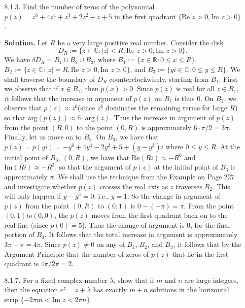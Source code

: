 \documentclass[9pt]{article}
\newcommand{\R}{\mathbb{R}}
\newcommand{\C}{\mathbb{C}}
\begin{document}
\begin{enumerate}
   \item[8.1.3.]  Find the number of zeros of the polynomial
                  $p(z) = z^6 + 4z^4 + z^3 + 2z^2 + z + 5$ in the first quadrant
                  $\{\text{Re }z > 0, \text{Im }z > 0\}$.
                  
      \textbf{Solution.} Let $R$ be a very large positive real number. Consider
      the disk
      $$D_R := \{z \in \C : |z| < R, \text{Re }z > 0, \text{Im }z > 0\}.$$
      We have $\delta D_R = B_1 \cup B_2 \cup B_3$, where
      $B_1 := \{x \in \R : 0 \le x \le R\}$, $B_2 := \{z \in \C : |z| = R, 
       \text{Re }z > 0, \text{Im }z > 0\}$, and
      $B_3 := \{yi \in \C : 0 \le y \le R\}$. We shall traverse the boundary
      of $D_R$ counterclockwisely, starting from $B_1$. First we observe that
      if $x \in B_1$, then $p(x) > 0$. Since $p(z)$ is real for all $z \in B_1$,
      it follows that the increase in argument of $p(z)$ on $B_1$ is thus 0.
      On $B_2$, we observe that $p(z) \approx z^6$(since $z^6$ dominates the
      remaining terms for large $R$) so that
      $\text{arg}(p(z)) \approx 6 \cdot \text{arg}(z)$. Thus the increase in
      argument of $p(z)$ from the point $(R, 0)$ to the point $(0, R)$ is
      approximately $6 \cdot \pi/ 2 = 3\pi$. Finally, let us move on to $B_3$.
      On $B_3$, we have that $p(z) = p(yi) = -y^6 + 4y^4 - 2y^2 + 5 + (y- y^3)i$
      where $0 \le y \le R$. At the initial point of $B_3$, $(0, R)$, we have
      that $\text{Re}(Ri) \approx -R^6$ and $\text{Im}(Ri) \approx -R^3$, so
      that the argument of $p(z)$ at the initial point of $B_3$ is approximately
      $\pi$. We shall use the technique from the Example on Page 227 and
      investigate whether $p(z)$  crosses the real axis as $z$ traverses $B_2$.
      This will only happen if $y - y^3 = 0$; i.e., $y = 1$. So the change in
      argument of $p(z)$ from the point $(0, R)$ to $(0, 1)$ is
      $0 - (-\pi) = \pi$. From the point $(0, 1) to (0, 0)$, the $p(z)$ moves
      from the first quadrant back on to the real line (since $p(0) = 5$). Thus
      the change of argument is 0, for the final portion of $B_3$. It follows
      that the total increase in argument is approximately $3\pi + \pi = 4\pi$.
      Since $p(z) \neq 0$ on any of $B_1$, $B_2$, and $B_3$, it follows that
      by the Argument Principle that the number of zeros of $p(z)$ that lie in
      the first quadrant is $4\pi/2\pi = 2$.
   \item[8.1.7.]  For a fixed complex number $\lambda$, show that if $m$ and $n$
                  are large integers, then the equation $e^z = z + \lambda$ has
                  exactly $m + n$ solutions in the horizontal strip
                  $\{-2\pi m < \text{Im }z < 2\pi n\}$.
                  

\end{enumerate}
\end{document}
